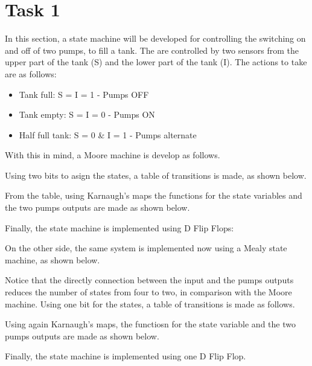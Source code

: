 


\section*{Task 1}

In this section, a state machine will be 
developed for controlling the switching
on and off of two pumps, to fill a tank.
The are controlled by two sensors from 
the upper part of the tank (S) and the 
lower part of the tank (I). The actions
to take are as follows:

\begin{itemize}
    \item Tank full: S = I = 1 - Pumps OFF
    \item Tank empty: S = I = 0 - Pumps ON
    \item Half full tank: S = 0 \& I = 1 - Pumps alternate 
\end{itemize}

With this in mind, a Moore machine is 
develop as follows.


Using two bits to asign the states, a table 
of transitions is made, as shown below.


From the table, using Karnaugh's maps the 
functions for the state variables and the 
two pumps outputs are made as shown below.


Finally, the state machine is implemented using 
D Flip Flops:


On the other side, the same system is implemented 
now using a Mealy state machine, as shown below.


Notice that the directly connection between the 
input and the pumps outputs reduces the number 
of states from four to two, in comparison with 
the Moore machine.
Using one bit for the states, a table of transitions
is made as follows.


Using again Karnaugh's maps, the functiosn for
the state variable and the two pumps outputs are
made as shown below.


Finally, the state machine is implemented using
one D Flip Flop.


